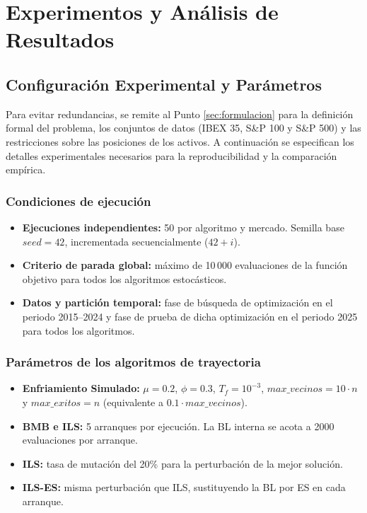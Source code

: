 \newpage
\section{Experimentos y Análisis de Resultados}
\label{sec:experimentos}

\subsection{Configuración Experimental y Parámetros}

Para evitar redundancias, se remite al Punto \ref{sec:formulacion} para la definición formal del problema, los conjuntos de datos (IBEX 35, S\&P 100 y S\&P 500) y las restricciones sobre las posiciones de los activos. A continuación se especifican los detalles experimentales necesarios para la reproducibilidad y la comparación empírica.

\subsubsection*{Condiciones de ejecución}

\begin{itemize}
    \item \textbf{Ejecuciones independientes:} 50 por algoritmo y mercado. Semilla base $seed=42$, incrementada secuencialmente ($42+i$).
    \item \textbf{Criterio de parada global:} máximo de 10\,000 evaluaciones de la función objetivo para todos los algoritmos estocásticos.
    \item \textbf{Datos y partición temporal:} fase de búsqueda de optimización en el periodo 2015--2024 y fase de prueba de dicha optimización en el periodo 2025 para todos los algoritmos.
\end{itemize}

\subsubsection*{Parámetros de los algoritmos de trayectoria}

\begin{itemize}
    \item \textbf{Enfriamiento Simulado:} $\mu=0.2$, $\phi=0.3$, $T_f=10^{-3}$, $max\_vecinos=10 \cdot n$ y $max\_exitos = n$ (equivalente a $0.1\cdot max\_vecinos$).
    \item \textbf{BMB e ILS:} 5 arranques por ejecución. La BL interna se acota a 2000 evaluaciones por arranque.
    \item \textbf{ILS:} tasa de mutación del 20\% para la perturbación de la mejor solución.
    \item \textbf{ILS-ES:} misma perturbación que ILS, sustituyendo la BL por ES en cada arranque.
\end{itemize}

